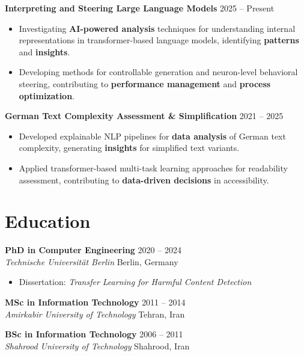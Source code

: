 \documentclass[11pt,a4paper]{article}
\newcommand{\cvitem}[1]{
    \item #1
}
\newcommand{\role}[4]{
    \textbf{#1} \hfill {\small #2} \\
    \textit{#3} \hfill {\small #4}
}
\begin{document}
\textbf{Interpreting and Steering Large Language Models} \hfill 2025 -- Present

\begin{itemize}
    \cvitem{Investigating \textbf{AI-powered analysis} techniques for understanding internal representations in transformer-based language models, identifying \textbf{patterns} and \textbf{insights}.}

    \cvitem{Developing methods for controllable generation and neuron-level behavioral steering, contributing to \textbf{performance management} and \textbf{process optimization}.}
\end{itemize}

\vspace{0.4em}

\textbf{German Text Complexity Assessment \& Simplification} \hfill 2021 -- 2025

\begin{itemize}
    \cvitem{Developed explainable NLP pipelines for \textbf{data analysis} of German text complexity, generating \textbf{insights} for simplified text variants.}

    \cvitem{Applied transformer-based multi-task learning approaches for readability assessment, contributing to \textbf{data-driven decisions} in accessibility.}
\end{itemize}

\vspace{0.7em}

\section*{Education}

\role
{PhD in Computer Engineering}
{2020 -- 2024}
{Technische Universität Berlin}
{Berlin, Germany}
\begin{itemize}
    \cvitem{Dissertation: \textit{Transfer Learning for Harmful Content Detection}}
\end{itemize}


\vspace{0.5em}

\role
{MSc in Information Technology}
{2011 -- 2014}
{Amirkabir University of Technology}
{Tehran, Iran}

\vspace{0.5em}

\role
{BSc in Information Technology}
{2006 -- 2011}
{Shahrood University of Technology}
{Shahrood, Iran}
\end{document}
